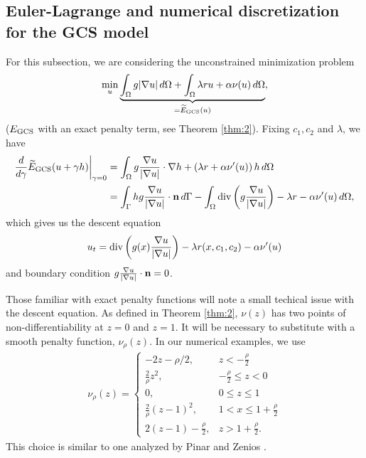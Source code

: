 \subsection{Euler-Lagrange and numerical discretization for the GCS model}
For this subsection, we are considering the unconstrained minimization problem 
\begin{align*}
\min_u \underbrace{\int_{\Omega } g\lvert\nabla u\rvert \,d\Omega 
+ \int_{\Omega} \lambda r u + \alpha \nu(u) \,d\Omega }_{=\widetilde E_{\textrm{GCS}}(u)},
\end{align*}
($E_\textrm{GCS}$ with an exact penalty term, see Theorem \ref{thm:2}).
Fixing $c_1, c_2$ and $\lambda$, we have
\begin{align*}
\frac{d}{d\gamma} \widetilde E_\textrm{GCS}(u + \gamma h)
\bigg\rvert_{\gamma = 0} 
&= \int_{\Omega} g \frac{\nabla u}{\lvert\nabla u\rvert} \cdot \nabla h
+ \left( \lambda r + \alpha \nu'(u) \right) h \,d\Omega 
\\
&= \int_{\Gamma} h g \frac{\nabla u}{\lvert\nabla u\rvert} \cdot \mathbf{n}  \, d \Gamma - \int_{\Omega } \operatorname{div}\left( g \frac{\nabla u}{\lvert\nabla u\rvert} \right) - \lambda r - \alpha \nu'(u) \,d\Omega ,
\end{align*}
which gives us the descent equation 
\begin{align}
\label{eq:gcs_el}
u_t = \operatorname{div}\left( g(x)  \frac{\nabla u}{\lvert\nabla u\rvert} \right) - \lambda r(x,c_1,c_2)- \alpha \nu'(u)
\end{align}
and boundary condition $g\frac{\nabla u}{\lvert\nabla u\rvert} \cdot \mathbf{n} = 0$. 

Those familiar with exact penalty functions will note a small techical issue with the descent equation. As defined in Theorem \ref{thm:2}, $\nu(z)$ has two points of non-differentiability at $z = 0$ and $z = 1$. It will be necessary to substitute with a smooth penalty function, $\nu_\rho(z)$. In our numerical examples, we use
\begin{align*}
\nu_\rho(z) = \begin{cases}
-2z - \rho/2, & z < -\frac{\rho }{2}
\\
\frac{2}{\rho} z^2, &-\frac{\rho}{2} \leq z < 0
\\
0, & 0\leq z \leq 1
\\
\frac{2}{\rho}(z-1)^2, & 1 < x \leq 1 + \frac{\rho }{2}
\\
2(z - 1) - \frac{\rho }{2}, & z > 1+\frac{\rho }{2}.
\end{cases}
\end{align*}
This choice is similar to one analyzed by Pinar and Zenios \cite{pinar1994smoothing}.

